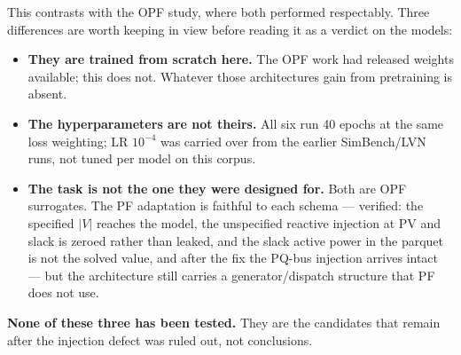\documentclass[10pt]{article}
\begin{document}
This contrasts with the OPF study, where both performed respectably. Three
differences are worth keeping in view before reading it as a verdict on the
models:
\begin{itemize}
\item \textbf{They are trained from scratch here.} The OPF work had released
weights available; this does not. Whatever those architectures gain from
pretraining is absent.
\item \textbf{The hyperparameters are not theirs.} All six run 40 epochs at the
same loss weighting; LR $10^{-4}$ was carried over from the earlier SimBench/LVN
runs, not tuned per model on this corpus.
\item \textbf{The task is not the one they were designed for.} Both are OPF
surrogates. The PF adaptation is faithful to each schema --- verified: the
specified $|V|$ reaches the model, the unspecified reactive injection at PV and
slack is zeroed rather than leaked, and the slack active power in the parquet is
not the solved value, and after the fix the PQ-bus injection arrives intact ---
but the architecture still carries a generator/dispatch structure that PF does
not use.
\end{itemize}

\textbf{None of these three has been tested.} They are the candidates that
remain after the injection defect was ruled out, not conclusions.
\end{document}
